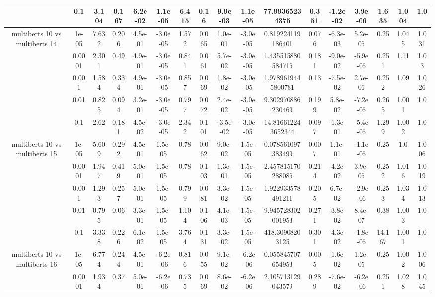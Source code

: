 \begin{tabular}{|c|c|c|c|c|c|c|c|c|c|c|c|c|c|c|c|c|}
 & 0.1 & 3.104 & 0.167 & 6.2e-02 & 1.1e-05 & 6.415 & 0.16 & 9.9e-03 & 1.1e-05 & 77.99365234375 & 0.351 & -1.2e-02 & 3.9e-06 & 1.635 & 1.004 & 1.0 \\
\hline
\multirow{5}{*}{multiberts 10 vs multiberts 14} & 1e-05 & 7.632 & 0.206 & 4.5e-01 & -3.0e-05 & 1.572 & 0.065 & 1.0e-01 & -3.0e-05 & 0.819224119186401 & 0.076 & -6.3e-03 & 5.2e-06 & 0.25 & 1.045 & 1.031 \\
 & 0.0001 & 2.301 & 0.49 & 4.9e-01 & -3.0e-05 & 0.841 & 0.061 & 5.7e-02 & -3.0e-05 & 1.435515880584716 & 0.181 & -9.0e-02 & -5.9e-06 & 0.251 & 1.11 & 1.03 \\
 & 0.001 & 1.584 & 0.334 & 4.9e-01 & -3.0e-05 & 0.857 & 0.069 & 1.8e-02 & -3.0e-05 & 1.9789619445800781 & 0.13 & -7.5e-02 & 2.7e-06 & 0.252 & 1.09 & 1.026 \\
 & 0.01 & 0.825 & 0.094 & 3.2e-01 & -3.0e-05 & 0.797 & 0.072 & 2.4e-02 & -3.0e-05 & 9.302970886230469 & 0.199 & 5.8e-02 & -7.2e-06 & 0.265 & 1.001 & 1.0 \\
 & 0.1 & 2.62 & 0.181 & 4.5e-02 & -3.0e-05 & 2.342 & 0.101 & -3.5e-02 & -3.0e-05 & 14.816612243652344 & 0.097 & -1.3e-01 & -5.4e-06 & 1.299 & 1.002 & 1.0 \\
\hline
\multirow{5}{*}{multiberts 10 vs multiberts 15} & 1e-05 & 5.609 & 0.292 & 4.5e-01 & 1.5e-05 & 0.78 & 0.062 & 9.0e-02 & 1.5e-05 & 0.078561097383499 & 0.007 & 1.1e-01 & -1.1e-06 & 0.25 & 1.0 & 1.006 \\
 & 0.0001 & 1.947 & 0.419 & 5.0e-01 & 1.5e-05 & 0.78 & 0.103 & 1.3e-01 & 1.5e-05 & 2.457815170288086 & 0.214 & -4.2e-02 & 3.9e-06 & 0.252 & 1.016 & 1.019 \\
 & 0.001 & 1.293 & 0.257 & 5.0e-01 & 1.5e-05 & 0.799 & 0.081 & 3.3e-02 & 1.5e-05 & 1.922933578491211 & 0.205 & 6.7e-02 & -2.9e-06 & 0.253 & 1.034 & 1.013 \\
 & 0.01 & 0.795 & 0.06 & 3.3e-01 & 1.5e-05 & 1.104 & 0.106 & 4.1e-03 & 1.5e-05 & 9.945728302001953 & 0.271 & -3.8e-02 & 8.4e-07 & 0.38 & 1.003 & 1.0 \\
 & 0.1 & 3.338 & 0.226 & 6.1e-02 & 1.5e-05 & 3.764 & 0.131 & 3.3e-02 & 1.5e-05 & 418.30908203125 & 0.301 & -4.3e-02 & -1.8e-06 & 14.167 & 1.001 & 1.0 \\
\hline
\multirow{5}{*}{multiberts 10 vs multiberts 16} & 1e-05 & 6.774 & 0.244 & 4.5e-01 & -6.2e-06 & 0.816 & 0.055 & 9.1e-02 & -6.2e-06 & 0.055845707654953 & 0.005 & -1.6e-02 & 1.2e-05 & 0.25 & 1.002 & 1.006 \\
 & 0.0001 & 1.934 & 0.37 & 5.0e-01 & -6.2e-06 & 0.735 & 0.069 & 8.6e-02 & -6.2e-06 & 2.105713129043579 & 0.289 & -7.6e-02 & -6.2e-06 & 0.251 & 1.028 & 1.045 \\

\end{tabular}
